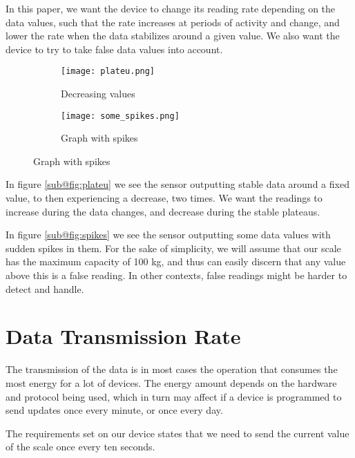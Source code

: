 In this paper, we want the device to change its reading rate depending on the data values, such that the rate increases at periods of activity and change, and lower the rate when the data stabilizes around a given value. We also want the device to try to take false data values into account.

\begin{figure}[H]
\centering
	\begin{subfigure}[b]{0.3\textwidth}
    \texttt{[image: plateu.png]}
    \caption{Decreasing values}
    \label{fig:plateu}
	\end{subfigure}
	\begin{subfigure}[b]{0.3\textwidth}
    \texttt{[image: some\_spikes.png]}
    \caption{Graph with spikes}
    \label{fig:spikes}
	\end{subfigure}
\end{figure}
In figure \ref{sub@fig:plateu} we see the sensor outputting stable data around a fixed value, to then experiencing a decrease, two times. We want the readings to increase during the data changes, and decrease during the stable plateaus.

In figure \ref{sub@fig:spikes} we see the sensor outputting some data values with sudden spikes in them. For the sake of simplicity, we will assume that our scale has the maximum capacity of 100 kg, and thus can easily discern that any value above this is a false reading. In other contexts, false readings might be harder to detect and handle.

\section{Data Transmission Rate}
The transmission of the data is in most cases the operation that consumes the most energy for a lot of devices. The energy amount depends on the hardware and protocol being used, which in turn may affect if a device is programmed to send updates once every minute, or once every day. 

The requirements set on our device states that we need to send the current value of the scale once every ten seconds.

